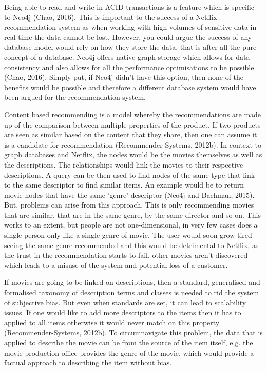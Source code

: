 \documentclass[a4paper]{article}
\begin{document}
Being able to read and write in ACID transactions is a feature which is specific to Neo4j (Chao, 2016). This is important to the success of a Netflix recommendation system as when working with high volumes of sensitive data in real-time the data cannot be lost. However, you could argue the success of any database model would rely on how they store the data, that is after all the pure concept of a database. Neo4j offers native graph storage which allows for data consistency and also allows for all the performance optimisations to be possible (Chao, 2016). Simply put, if Neo4j didn't have this option, then none of the benefits would be possible and therefore a different database system would have been argued for the recommendation system. \par

Content based recommending is a model whereby the recommendations are made up of the comparison between multiple properties of the product. If two products are seen as similar based on the content that they share, then one can assume it is a candidate for recommendation (Recommender-Systems, 2012b). In context to graph databases and Netflix, the nodes would be the movies themselves as well as the descriptions. The relationships would link the movies to their respective descriptions. A query can be then used to find nodes of the same type that link to the same descriptor to find similar items. An example would be to return movie nodes that have the same 'genre' descriptor (Neo4j and Bachman, 2015). But, problems can arise from this approach. This is only recommending movies that are similar, that are in the same genre, by the same director and so on. This works to an extent, but people are not one-dimensional, in very few cases does a single person only like a single genre of movie. The user would soon grow tired seeing the same genre recommended and this would be detrimental to Netflix, as the trust in the recommendation starts to fail, other movies aren't discovered which leads to a misuse of the system and potential loss of a customer. \par

If movies are going to be linked on descriptions, then a standard, generalised and formalised taxonomy of description terms and classes is needed to rid the system of subjective bias. But even when standards are set, it can lead to scalability issues. If one would like to add more descriptors to the items then it has to applied to all items otherwise it would never match on this property (Recommender-Systems, 2012b). To circumnavigate this problem, the data that is applied to describe the movie can be from the source of the item itself, e.g. the movie production office provides the genre of the movie, which would provide a factual approach to describing the item without bias.
\end{document}
